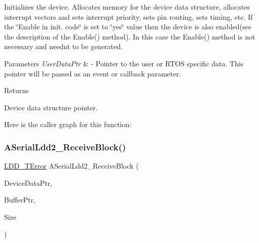 Initializes the device. Allocates memory for the device data structure, allocates interrupt vectors and sets interrupt priority, sets pin routing, sets timing, etc. If the \char`\"{}\+Enable
    in init. code\char`\"{} is set to \char`\"{}yes\char`\"{} value then the device is also enabled(see the description of the Enable() method). In this case the Enable() method is not necessary and needn\textquotesingle{}t to be generated. 


\begin{DoxyParams}{Parameters}
{\em User\+Data\+Ptr} & -\/ Pointer to the user or R\+T\+OS specific data. This pointer will be passed as an event or callback parameter. \\
\hline
\end{DoxyParams}
\begin{DoxyReturn}{Returns}

\begin{DoxyItemize}
\item Device data structure pointer. 
\end{DoxyItemize}
\end{DoxyReturn}
Here is the caller graph for this function\+:
\mbox{\label{group___a_serial_ldd2__module_gaf41a4ccffe5f5791cbc9b6e6e912962d}} 
\subsubsection{\texorpdfstring{A\+Serial\+Ldd2\+\_\+\+Receive\+Block()}{ASerialLdd2\_ReceiveBlock()}}
{\footnotesize\ttfamily \hyperlink{group___p_e___types__module_ga24c2b045fd04e79e85f261ce4df35588}{L\+D\+D\+\_\+\+T\+Error} A\+Serial\+Ldd2\+\_\+\+Receive\+Block (\begin{DoxyParamCaption}\item[{\hyperlink{group___p_e___types__module_gac5cf1362f1f0e3a2ce71b1bf2276d091}{L\+D\+D\+\_\+\+T\+Device\+Data} $\ast$}]{Device\+Data\+Ptr,  }\item[{\hyperlink{group___p_e___types__module_gade8ef9401405bd941b6da738b807f980}{L\+D\+D\+\_\+\+T\+Data} $\ast$}]{Buffer\+Ptr,  }\item[{uint16\+\_\+t}]{Size }\end{DoxyParamCaption})}



